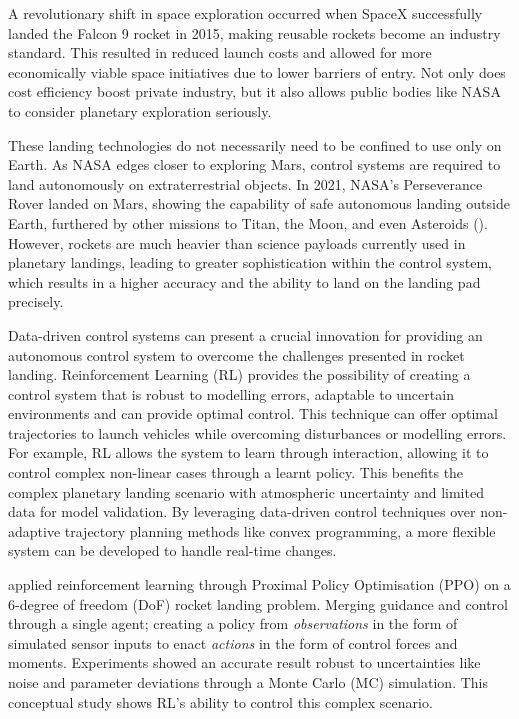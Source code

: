 A revolutionary shift in space exploration occurred when SpaceX successfully landed the Falcon 9 rocket in 2015, making reusable rockets become an industry standard. This resulted in reduced launch costs and allowed for more economically viable space initiatives due to lower barriers of entry. Not only does cost efficiency boost private industry, but it also allows public bodies like NASA to consider planetary exploration seriously.

These landing technologies do not necessarily need to be confined to use only on Earth. As NASA edges closer to exploring Mars, control systems are required to land autonomously on extraterrestrial objects. In 2021, NASA’s Perseverance Rover landed on Mars, showing the capability of safe autonomous landing outside Earth, furthered by other missions to Titan, the Moon, and even Asteroids (\cite{Blackmore2016}). However, rockets are much heavier than science payloads currently used in planetary landings, leading to greater sophistication within the control system, which results in a higher accuracy and the ability to land on the landing pad precisely.


Data-driven control systems can present a crucial innovation for providing an autonomous control system to overcome the challenges presented in rocket landing. Reinforcement Learning (RL) provides the possibility of creating a control system that is robust to modelling errors, adaptable to uncertain environments and can provide optimal control. This technique can offer optimal trajectories to launch vehicles while overcoming disturbances or modelling errors. For example, RL allows the system to learn through interaction, allowing it to control complex non-linear cases through a learnt policy. This benefits the complex planetary landing scenario with atmospheric uncertainty and limited data for model validation. By leveraging data-driven control techniques over non-adaptive trajectory planning methods like convex programming, a more flexible system can be developed to handle real-time changes.

\cite{Gaudet2018} applied reinforcement learning through Proximal Policy Optimisation (PPO) on a 6-degree of freedom (DoF) rocket landing problem. Merging guidance and control through a single agent; creating a policy from \textit{observations} in the form of simulated sensor inputs to enact \textit{actions} in the form of control forces and moments. Experiments showed an accurate result robust to uncertainties like noise and parameter deviations through a Monte Carlo (MC) simulation. This conceptual study shows RL's ability to control this complex scenario. 


